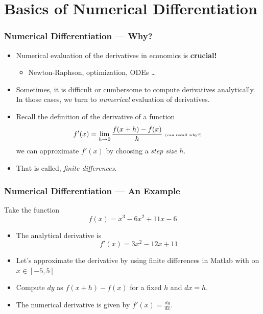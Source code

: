 \documentclass[11pt,xcolor={svgnames},aspectratio=169,usepdftitle=false,notheorems]{beamer}
\begin{document}
\section{Basics of Numerical Differentiation}

\begin{frame}
  \frametitle{Numerical Differentiation --- Why?}
\begin{itemize}
  \item Numerical evaluation of the derivatives in economics is \alert{\textbf{crucial!}}
  \begin{itemize}
    \item Newton-Raphson, optimization, ODEs \ldots
  \end{itemize}
  \item Sometimes, it is difficult or cumbersome to compute derivatives analytically. In those cases, we turn to \textit{numerical} evaluation of derivatives.
  \item Recall the definition of the derivative of a function
  \[
  f'(x) = \lim_{h\rightarrow 0} \frac{f(x+h) - f(x)}{h} \text{ \tiny (can recall why?) }
  \]
  we can approximate $f'(x)$ by choosing a \textit{step size} $h$.
  \item That is called, \textit{finite differences}.
\end{itemize}
\end{frame}

\begin{frame}
  \frametitle{Numerical Differentiation --- An Example}
Take the function 
\[
f(x) = x^3 - 6x^2 + 11x - 6
\]
\begin{itemize}
  \item The analytical derivative is 
  \[
  f'(x) = 3x^2 - 12x + 11
  \]
  \item Let's approximate the derivative by using finite differences in Matlab with on $x\in [-5,5]$
  \item Compute $dy$ as $f(x+h) - f(x)$ for a fixed $h$ and $dx = h$.
  \item The numerical derivative is given by $f'(x) = \frac{dy}{dx}$.
\end{itemize}
\end{frame}
\end{document}
